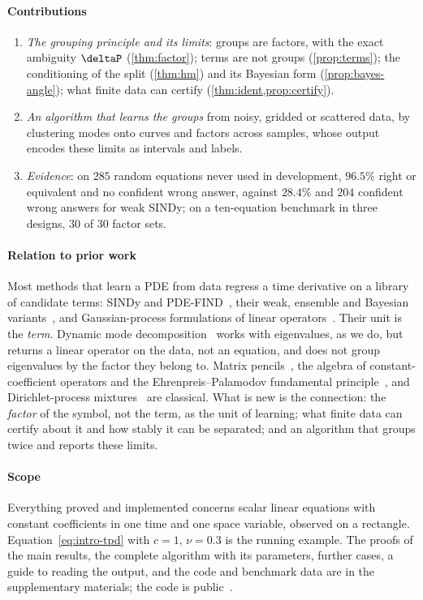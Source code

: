 \paragraph{Contributions}
\begin{enumerate}
  \item \emph{The grouping principle and its limits}: groups are factors, with the exact ambiguity $\deltaP$
  (\cref{thm:factor}); terms are not groups (\cref{prop:terms}); the conditioning of the split (\cref{thm:hm}) and its
  Bayesian form (\cref{prop:bayes-angle}); what finite data can certify (\cref{thm:ident,prop:certify}).
  \item \emph{An algorithm that learns the groups} from noisy, gridded or scattered data, by clustering modes onto
  curves and factors across samples, whose output encodes these limits as intervals and labels.
  \item \emph{Evidence}: on $285$ random equations never used in development, $96.5\%$ right or equivalent and no
  confident wrong answer, against $28.4\%$ and $204$ confident wrong answers for weak SINDy; on a ten-equation
  benchmark in three designs, $30$ of $30$ factor sets.
\end{enumerate}

\paragraph{Relation to prior work}
Most methods that learn a PDE from data regress a time derivative on a library of candidate terms: SINDy and
PDE-FIND~\cite{BruProKut16,RudBruProKut17}, their weak, ensemble and Bayesian variants~\cite{MesBor21,FasKutBru22,HirBarKut22},
and Gaussian-process formulations of linear operators~\cite{RaiPerKar17}. Their unit is the \emph{term}. Dynamic mode
decomposition~\cite{Sch10,SasKut22} works with eigenvalues, as we do, but returns a linear operator on the data, not an
equation, and does not group eigenvalues by the factor they belong to. Matrix pencils~\cite{HuaSar90}, the algebra of
constant-coefficient operators and the Ehrenpreis--Palamodov fundamental principle~\cite{Ehr70,Pal70,Mal56,Hor90,Obe90},
and Dirichlet-process mixtures~\cite{BleJor06} are classical. What is new is the connection: the \emph{factor} of the
symbol, not the term, as the unit of learning; what finite data can certify about it and how stably it can be
separated; and an algorithm that groups twice and reports these limits.

\paragraph{Scope} Everything proved and implemented concerns scalar linear equations with constant coefficients in one
time and one space variable, observed on a rectangle. Equation~\eqref{eq:intro-tpd} with $c=1$, $\nu=0.3$ is the running
example. The proofs of the main results, the complete algorithm with its parameters, further cases, a guide to reading the
output, and the code and benchmark data are in the supplementary materials; the code is public~\cite{Pri26code}.

